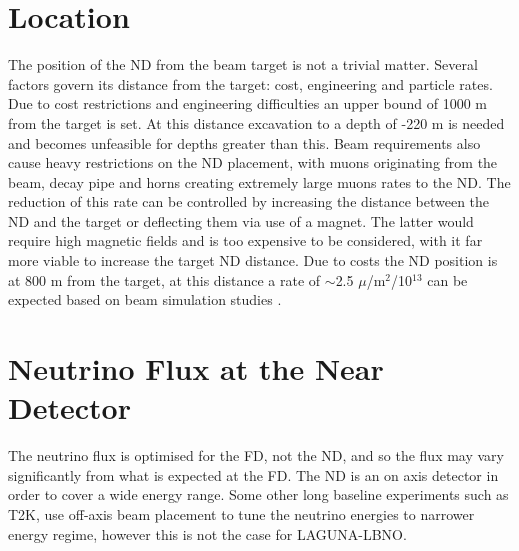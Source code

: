 \section{Location}
The position of the ND from the beam target is not a trivial matter. Several factors govern its distance from the target: cost, engineering and particle rates. Due to cost restrictions and engineering difficulties an upper bound of 1000 m from the target is set. At this distance excavation to a depth of -220 m is needed and becomes unfeasible for depths greater than this. Beam requirements also cause heavy restrictions on the ND placement, with muons originating from the beam, decay pipe and horns creating extremely large muons rates to the ND. The reduction of this rate can be controlled by increasing the distance between the ND and the target or deflecting them via use of a magnet. The latter would require high magnetic fields and is too expensive to be considered, with it far more viable to increase the target ND distance. Due to costs the ND position is at 800 m from the target, at this distance a rate of $\sim$2.5 $\mu$/m$^{2}$/10$^{13}$ can be expected based on beam simulation studies \cite{lbnoInternal}.


\section{Neutrino Flux at the Near Detector}
The neutrino flux is optimised for the FD, not the ND, and so the flux may vary significantly from what is expected at the FD. The ND is an on axis detector in order to cover a wide energy range. Some other long baseline experiments such as T2K, use off-axis beam placement to tune the neutrino energies to narrower energy regime, however this is not the case for LAGUNA-LBNO. 

